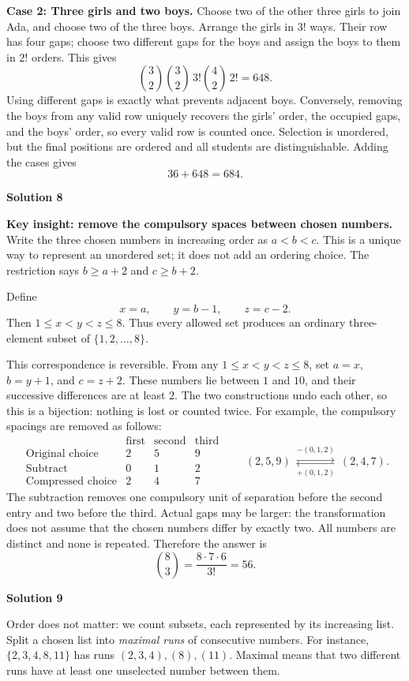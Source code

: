 \documentclass[11pt]{article}
\newcommand{\solution}[1]{%
  \par\Needspace{5\baselineskip}\addvspace{.8\baselineskip}%
  {\large\bfseries Solution #1\par}\nopagebreak[4]}
\begin{document}
\textbf{Case 2: Three girls and two boys.}
Choose two of the other three girls to join Ada, and choose two of the
three boys. Arrange the girls in $3!$ ways. Their row has four gaps;
choose two different gaps for the boys and assign the boys to them
in $2!$ orders. This gives
\[
\binom32\binom32\,3!\binom42\,2!=648.
\]
Using different gaps is exactly what prevents adjacent boys. Conversely,
removing the boys from any valid row uniquely recovers the girls' order,
the occupied gaps, and the boys' order, so every valid row is counted once.
Selection is unordered, but the final positions are ordered and all
students are distinguishable. Adding the cases gives
\[
36+648=\boxed{684}.
\]



\clearpage
\solution{8}
\textbf{Key insight: remove the compulsory spaces between chosen numbers.}
Write the three chosen numbers in increasing order as $a<b<c$.
This is a unique way to represent an unordered set; it does not add
an ordering choice. The restriction says $b\geq a+2$ and $c\geq b+2$.

Define
\[
x=a,\qquad y=b-1,\qquad z=c-2.
\]
Then $1\leq x<y<z\leq8$. Thus every allowed set produces an ordinary
three-element subset of $\{1,2,\ldots,8\}$.

This correspondence is reversible. From any $1\leq x<y<z\leq8$,
set $a=x$, $b=y+1$, and $c=z+2$. These numbers lie between $1$ and $10$,
and their successive differences are at least $2$. The two constructions
undo each other, so this is a bijection: nothing is lost or counted twice.
For example, the compulsory spacings are removed as follows:
\[
\begin{array}{c|ccc}
 &\text{first}&\text{second}&\text{third}\\\hline
\text{Original choice}&2&5&9\\
\text{Subtract}&0&1&2\\\hline
\text{Compressed choice}&2&4&7
\end{array}
\qquad
(2,5,9)\ \underset{+(0,1,2)}{\overset{-(0,1,2)}{\rightleftarrows}}\ (2,4,7).
\]
The subtraction removes one compulsory unit of separation before the
second entry and two before the third. Actual gaps may be larger:
the transformation does not assume that the chosen numbers differ
by exactly two. All numbers are distinct and none is repeated. Therefore the answer is
\[
\binom83=\frac{8\cdot7\cdot6}{3!}=\boxed{56}.
\]

\vspace{-8mm}
\solution{9}
Order does not matter: we count subsets, each represented by its
increasing list. Split a chosen list into \emph{maximal runs} of
consecutive numbers. For instance, $\{2,3,4,8,11\}$ has runs
$(2,3,4),(8),(11)$. Maximal means that two different runs have at least
one unselected number between them.
\end{document}
